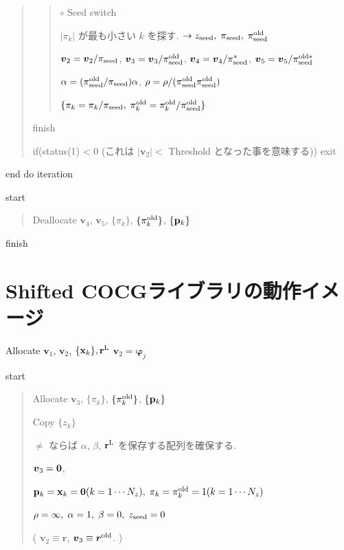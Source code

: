 \documentclass[letterpaper,10pt,dvipdfmx,openany]{sphinxmanual}
\begin{document}
\begin{quote}
\begin{quote}
\(\circ\) Seed switch

\(|\pi_k|\) が最も小さい \(k\) を探す.
\(\rightarrow z_{\rm seed},\; \pi_{\rm seed},\; \pi_{\rm seed}^{\rm old}\)

\({\boldsymbol v}_2 = {\boldsymbol v}_2 / \pi_{\rm seed}\),
\({\boldsymbol v}_3 = {\boldsymbol v}_3 / \pi_{\rm seed}^{\rm old}\),
\({\boldsymbol v}_4 = {\boldsymbol v}_4 / \pi_{\rm seed}^{*}\),
\({\boldsymbol v}_5 = {\boldsymbol v}_5 / \pi_{\rm seed}^{\rm old *}\)

\(\alpha = (\pi_{\rm seed}^{\rm old} / \pi_{\rm seed}) \alpha\),
\(\rho = \rho / (\pi_{\rm seed}^{\rm old} \pi_{\rm seed}^{\rm old})\)

\(\{\pi_k = \pi_k / \pi_{\rm seed},\; \pi_k^{\rm old} = \pi_k^{\rm old} / \pi_{\rm seed}^{\rm old}\}\)
\end{quote}

 finish

if(status(1) \textless{} 0 (これは \(|{\boldsymbol v}_2| <\) Threshold となった事を意味する)) exit
\end{quote}

end do iteration

 start
\begin{quote}

Deallocate \({\boldsymbol v}_4\), \({\boldsymbol v}_5\),
\(\{\pi_k\}\), \(\{\pi_k^{\rm old}\}\), \(\{{\bf p}_k\}\)
\end{quote}

 finish


\section{Shifted COCGライブラリの動作イメージ}
\label{komega_workflow_ja:shifted-cocg}
Allocate \({\boldsymbol v}_1\), \({\boldsymbol v}_2\),
\(\{{\bf x}_k\}, {\bf r}^{\rm L}\)
\({\boldsymbol v}_2 = {\boldsymbol \varphi_j}\)

 start
\begin{quote}

Allocate \({\boldsymbol v}_3\), \(\{\pi_k\}\),
\(\{\pi_k^{\rm old}\}\), \(\{{\bf p}_k\}\)

Copy \(\{z_k\}\)

 \(\neq\)  ならば \(\alpha\),
\(\beta\), \({\bf r}^{\rm L}\) を保存する配列を確保する.

\({\boldsymbol v}_3 = {\bf 0}\),

\({\bf p}_{k} = {\bf x}_k = {\bf 0}(k=1 \cdots N_z),\; \pi_k=\pi_k^{\rm old} = 1(k=1 \cdots N_z)\)

\(\rho = \infty,\; \alpha = 1,\; \beta=0,\; z_{\rm seed}=0\)

( \({\boldsymbol v}_2 \equiv {\boldsymbol r}\),
\({\boldsymbol v}_3 \equiv {\boldsymbol r}^{\rm old}\). )
\end{quote}
\end{document}
